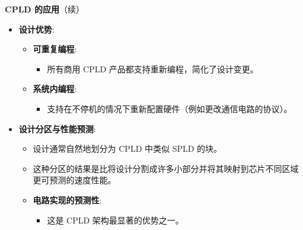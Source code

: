 \documentclass[
  ignorenonframetext,
  chinese,
]{beamer}
\providecommand{\tightlist}{%
  \setlength{\itemsep}{0pt}\setlength{\parskip}{0pt}}
\begin{document}
\begin{frame}
\begin{block}{\textbf{CPLD 的应用}（续）}
\begin{itemize}
\tightlist
\item
  \textbf{设计优势}:

  \begin{itemize}
  \tightlist
  \item
    \textbf{可重复编程}:

    \begin{itemize}
    \tightlist
    \item
      所有商用 CPLD 产品都支持重新编程，简化了设计变更。
    \end{itemize}
  \item
    \textbf{系统内编程}:

    \begin{itemize}
    \tightlist
    \item
      支持在不停机的情况下重新配置硬件（例如更改通信电路的协议）。
    \end{itemize}
  \end{itemize}
\item
  \textbf{设计分区与性能预测}:

  \begin{itemize}
  \tightlist
  \item
    设计通常自然地划分为 CPLD 中类似 SPLD 的块。
  \item
    这种分区的结果是比将设计分割成许多小部分并将其映射到芯片不同区域更可预测的速度性能。
  \item
    \textbf{电路实现的预测性}:

    \begin{itemize}
    \tightlist
    \item
        这是 CPLD 架构最显著的优势之一。
    \end{itemize}
  \end{itemize}
\end{itemize}
\end{block}
\end{frame}
\end{document}

